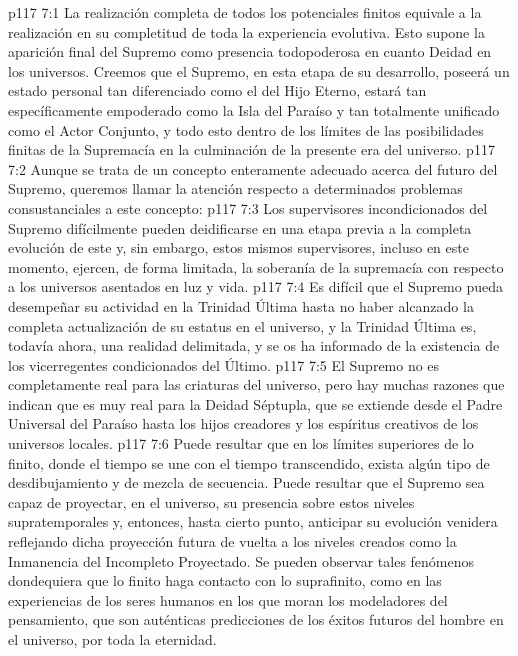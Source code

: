 \vs p117 7:1 La realización completa de todos los potenciales finitos equivale a la realización en su completitud de toda la experiencia evolutiva. Esto supone la aparición final del Supremo como presencia todopoderosa en cuanto Deidad en los universos. Creemos que el Supremo, en esta etapa de su desarrollo, poseerá un estado personal tan diferenciado como el del Hijo Eterno, estará tan específicamente empoderado como la Isla del Paraíso y tan totalmente unificado como el Actor Conjunto, y todo esto dentro de los límites de las posibilidades finitas de la Supremacía en la culminación de la presente era del universo.
\vs p117 7:2 Aunque se trata de un concepto enteramente adecuado acerca del futuro del Supremo, queremos llamar la atención respecto a determinados problemas consustanciales a este concepto:
\vs p117 7:3 Los supervisores incondicionados del Supremo difícilmente pueden deidificarse en una etapa previa a la completa evolución de este y, sin embargo, estos mismos supervisores, incluso en este momento, ejercen, de forma limitada, la soberanía de la supremacía con respecto a los universos asentados en luz y vida.
\vs p117 7:4 Es difícil que el Supremo pueda desempeñar su actividad en la Trinidad Última hasta no haber alcanzado la completa actualización de su estatus en el universo, y la Trinidad Última es, todavía ahora, una realidad delimitada, y se os ha informado de la existencia de los vicerregentes condicionados del Último.
\vs p117 7:5 El Supremo no es completamente real para las criaturas del universo, pero hay muchas razones que indican que es muy real para la Deidad Séptupla, que se extiende desde el Padre Universal del Paraíso hasta los hijos creadores y los espíritus creativos de los universos locales.
\vs p117 7:6 \pc Puede resultar que en los límites superiores de lo finito, donde el tiempo se une con el tiempo transcendido, exista algún tipo de desdibujamiento y de mezcla de secuencia. Puede resultar que el Supremo sea capaz de proyectar, en el universo, su presencia sobre estos niveles supratemporales y, entonces, hasta cierto punto, anticipar su evolución venidera reflejando dicha proyección futura de vuelta a los niveles creados como la Inmanencia del Incompleto Proyectado. Se pueden observar tales fenómenos dondequiera que lo finito haga contacto con lo suprafinito, como en las experiencias de los seres humanos en los que moran los modeladores del pensamiento, que son auténticas predicciones de los éxitos futuros del hombre en el universo, por toda la eternidad.
